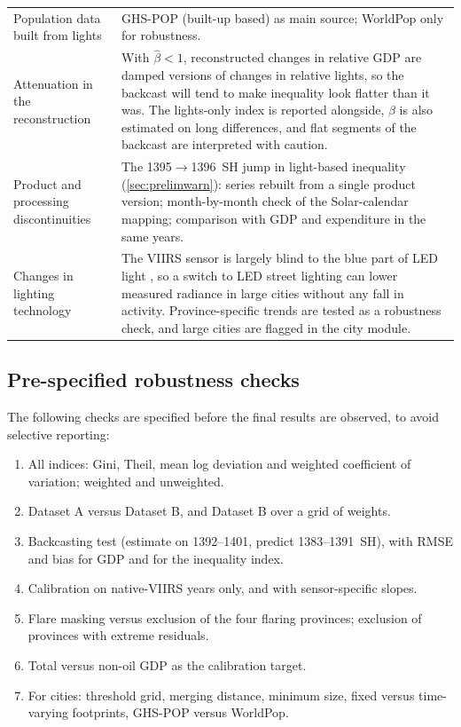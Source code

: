 \documentclass[11pt,a4paper]{article}
\begin{document}
\begin{table}[htbp]
\begin{tabularx}{\textwidth}{@{}>{\raggedright\arraybackslash}p{3.6cm}>{\raggedright\arraybackslash}X@{}}
\addlinespace
Population data built from lights & GHS-POP (built-up based) as main source; WorldPop only for robustness.\\
\addlinespace
Attenuation in the reconstruction & With $\hat\beta<1$, reconstructed changes in relative GDP are damped versions of changes in relative lights, so the backcast will tend to make inequality look flatter than it was. The lights-only index is reported alongside, $\beta$ is also estimated on long differences, and flat segments of the backcast are interpreted with caution.\\
\addlinespace
Product and processing discontinuities & The 1395$\to$1396~SH jump in light-based inequality (\cref{sec:prelimwarn}): series rebuilt from a single product version; month-by-month check of the Solar-calendar mapping; comparison with GDP and expenditure in the same years.\\
\addlinespace
Changes in lighting technology & The VIIRS sensor is largely blind to the blue part of LED light \citep{Kyba2017}, so a switch to LED street lighting can lower measured radiance in large cities without any fall in activity. Province-specific trends are tested as a robustness check, and large cities are flagged in the city module.\\
\bottomrule
\end{tabularx}
\end{table}

\subsection{Pre-specified robustness checks}

The following checks are specified before the final results are observed, to avoid selective reporting:
\begin{enumerate}[label=\arabic*.]
\item All indices: Gini, Theil, mean log deviation and weighted coefficient of variation; weighted and unweighted.
\item Dataset A versus Dataset B, and Dataset B over a grid of weights.
\item Backcasting test (estimate on 1392--1401, predict 1383--1391~SH), with RMSE and bias for GDP and for the inequality index.
\item Calibration on native-VIIRS years only, and with sensor-specific slopes.
\item Flare masking versus exclusion of the four flaring provinces; exclusion of provinces with extreme residuals.
\item Total versus non-oil GDP as the calibration target.
\item For cities: threshold grid, merging distance, minimum size, fixed versus time-varying footprints, GHS-POP versus WorldPop.
\end{enumerate}
\end{document}
